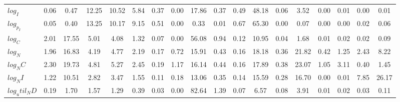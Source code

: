 \begin{center}
\begin{longtable}{lccccccccccccccccc}
$log_I        $	 & 	            0.06	 & 	            0.47	 & 	           12.25	 & 	           10.52	 & 	            5.84	 & 	            0.37	 & 	            0.00	 & 	           17.86	 & 	            0.37	 & 	            0.49	 & 	           48.18	 & 	            0.06	 & 	            3.52	 & 	            0.00	 & 	            0.01	 & 	            0.00	 & 	            0.01 \\ 
$log_p_I      $	 & 	            0.05	 & 	            0.40	 & 	           13.25	 & 	           10.17	 & 	            9.15	 & 	            0.51	 & 	            0.00	 & 	            0.33	 & 	            0.01	 & 	            0.67	 & 	           65.30	 & 	            0.00	 & 	            0.07	 & 	            0.00	 & 	            0.00	 & 	            0.02	 & 	            0.06 \\ 
$log_C        $	 & 	            2.01	 & 	           17.55	 & 	            5.01	 & 	            4.08	 & 	            1.32	 & 	            0.07	 & 	            0.00	 & 	           56.08	 & 	            0.94	 & 	            0.12	 & 	           10.95	 & 	            0.04	 & 	            1.68	 & 	            0.01	 & 	            0.02	 & 	            0.02	 & 	            0.09 \\ 
$log_N        $	 & 	            1.96	 & 	           16.83	 & 	            4.19	 & 	            4.77	 & 	            2.19	 & 	            0.17	 & 	            0.72	 & 	           15.91	 & 	            0.43	 & 	            0.16	 & 	           18.18	 & 	            0.36	 & 	           21.82	 & 	            0.42	 & 	            1.25	 & 	            2.43	 & 	            8.22 \\ 
$log_NC       $	 & 	            2.30	 & 	           19.73	 & 	            4.81	 & 	            5.27	 & 	            2.45	 & 	            0.19	 & 	            1.17	 & 	           16.14	 & 	            0.44	 & 	            0.16	 & 	           17.89	 & 	            0.38	 & 	           23.07	 & 	            1.05	 & 	            3.11	 & 	            0.40	 & 	            1.45 \\ 
$log_NI       $	 & 	            1.22	 & 	           10.51	 & 	            2.82	 & 	            3.47	 & 	            1.55	 & 	            0.11	 & 	            0.18	 & 	           13.06	 & 	            0.35	 & 	            0.14	 & 	           15.59	 & 	            0.28	 & 	           16.70	 & 	            0.00	 & 	            0.01	 & 	            7.85	 & 	           26.17 \\ 
$log_util_ND  $	 & 	            0.19	 & 	            1.70	 & 	            1.57	 & 	            1.29	 & 	            0.39	 & 	            0.03	 & 	            0.00	 & 	           82.64	 & 	            1.39	 & 	            0.07	 & 	            6.57	 & 	            0.08	 & 	            3.91	 & 	            0.01	 & 	            0.02	 & 	            0.03	 & 	            0.11 \\ 

\end{longtable}
\end{center}
